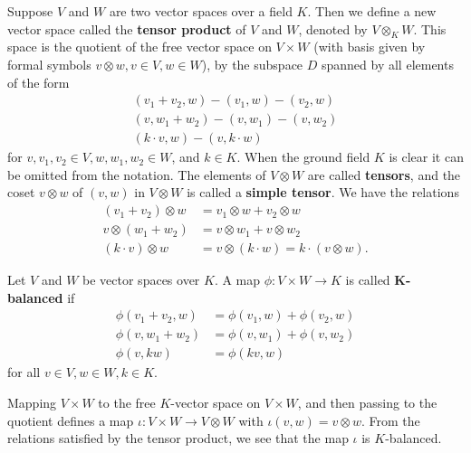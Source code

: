 \begin{defn}
Suppose $V$ and $W$ are two vector spaces over a field $K$. Then we define a new vector space called the \textbf{tensor product} of $V$ and $W$, denoted by $V \otimes_{K} W$.  This space is the quotient of the free vector space on $V \times W$ (with basis given by formal symbols $v \otimes w, v\in V, w \in W$), by the subspace $D$ spanned by all elements of the form
\begin{align*}
(v_1 + v_2, w) - (v_1 , w) - (v_2 , w) \\
(v , w_1 + w_2) - (v , w_1) - (v , w_2) \\
(k \cdot v , w) -( v , k \cdot w)
\end{align*}
for $v, v_1, v_2 \in V, w, w_1, w_2 \in W$, and $k \in K$. When the ground field $K$ is clear it can be omitted from the notation.  The elements of $V \otimes W$ are called \textbf{tensors}, and the coset $v \otimes w$ of $(v,w)$ in $V \otimes W$ is called a \textbf{simple tensor}.  We have the relations
\begin{align*}
(v_1 + v_2) \otimes w &= v_1 \otimes w + v_2 \otimes w \\
v \otimes (w_1 + w_2) &= v \otimes w_1 + v \otimes w_2 \\
(k \cdot v) \otimes w &= v \otimes (k \cdot w) = k \cdot (v \otimes w).
\end{align*}
\end{defn}

\begin{defn}
Let $V$ and $W$ be vector spaces over $K$.  A map $\phi \colon V \times W \to K$ is called $\mathbf{K}$\textbf{-balanced} if \begin{align*}
\phi( v_1 + v_2, w) &= \phi(v_1, w) + \phi(v_2, w) \\
\phi(v, w_1 + w_2) &= \phi (v, w_1) + \phi(v, w_2) \\
\phi(v, kw) &= \phi( kv, w)
\end{align*}
for all $v \in V, w \in W, k \in K$.
\end{defn}
\begin{example}
Mapping $V \times W$ to the free $K$-vector space on $V \times W$, and then passing to the quotient defines a map $\iota \colon V \times W \to V \otimes W$ with $\iota (v,w) = v \otimes w$.  From the relations satisfied by the tensor product, we see that the map $\iota$ is $K$-balanced.
\end{example}

